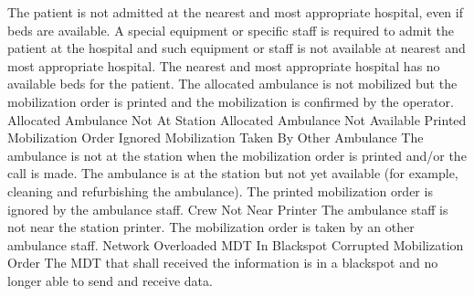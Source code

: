 \stopkaosspec
\startkaosspec
	 {The patient is not admitted at the nearest and most appropriate hospital, even if beds are available.}
\stopkaosspec
\startkaosspec
	 {A special equipment or specific staff is required to admit the patient at the hospital and such equipment or staff is not available at nearest and most appropriate hospital.}
\stopkaosspec
\startkaosspec
	 {The nearest and most appropriate hospital has no available beds for the patient.}
\stopkaosspec
\startkaosspec
	 {The allocated ambulance is not mobilized but the mobilization order is printed and the mobilization is confirmed by the operator.}
	 {Allocated Ambulance Not At Station}
	 {Allocated Ambulance Not Available}
	 {Printed Mobilization Order Ignored}
	 {Mobilization Taken By Other Ambulance}
\stopkaosspec
\startkaosspec
	 {The ambulance is not at the station when the mobilization order is printed and/or the call is made.}
\stopkaosspec
\startkaosspec
	 {The ambulance is at the station but not yet available (for example, cleaning and refurbishing the ambulance).}
\stopkaosspec
\startkaosspec
	 {The printed mobilization order is ignored by the ambulance staff.}
	 {Crew Not Near Printer}
\stopkaosspec
\startkaosspec
	 {The ambulance staff is not near the station printer.}
\stopkaosspec
\startkaosspec
	 {The mobilization order is taken by an other ambulance staff.}
\stopkaosspec
\startkaosspec
	 {}
	 {Network Overloaded}
	 {MDT In Blackspot}
	 {Corrupted Mobilization Order}
\stopkaosspec
\startkaosspec
	 {The MDT that shall received the information is in a blackspot and no longer able to send and receive data.}
\stopkaosspec
\startkaosspec

